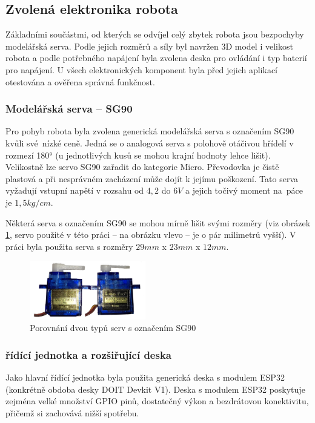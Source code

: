 \subsection*{Zvolená elektronika robota}
Základními součástmi, od kterých se odvíjel celý zbytek robota jsou bezpochyby modelářská serva. Podle jejich rozměrů a síly byl navržen 3D model i velikost robota a podle potřebného napájení byla zvolena deska pro ovládání i typ baterií pro napájení. U všech elektronických komponent byla před jejich aplikací otestována a ověřena správná funkčnost.

\subsubsection*{Modelářská serva -- SG90}
Pro pohyb robota byla zvolena generická modelářská serva s označením SG90 kvůli své~nízké ceně. Jedná se o analogová serva s polohově otáčivou hřídelí v rozmezí 180° (u jednotlivých kusů se mohou krajní hodnoty lehce lišit). Velikostně lze servo SG90 zařadit do kategorie Micro. Převodovka je čistě plastová a při nesprávném zacházení může dojít k jejímu poškození. Tato serva vyžadují vstupní napětí v rozsahu od $4,2$ do $6V$ a jejich točivý moment na~páce je $1,5kg/cm$.

Některá serva s označením SG90 se mohou mírně lišit svými rozměry (viz obrázek \ref{servocompare}, servo použité v této práci -- na obrázku vlevo -- je o pár milimetrů vyšší). V práci byla použita serva s rozměry $29mm$ x $23mm$ x $12mm$.

\begin{figure}[hbt]
	\centering
	\includegraphics[width=0.45\textwidth]{obrazky-figures/servocompare.png}
	\caption{Porovnání dvou typů serv s označením SG90}
    \label{servocompare}
\end{figure}

\subsubsection*{řídící jednotka a rozšiřující deska}
Jako hlavní řídící jednotka byla použita generická deska s modulem ESP32 (konkrétně obdoba desky DOIT Devkit V1). Deska s modulem ESP32 poskytuje zejména velké množství GPIO pinů, dostatečný výkon a bezdrátovou konektivitu, přičemž si zachovává nižší spotřebu.

